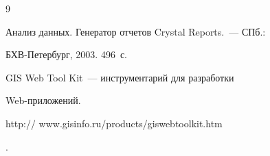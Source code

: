 {{\begin{thebibliography}{9}


      Анализ данных. Генератор отчетов Crystal Reports.~--- СПб.: 


      БХВ-Петербург, 2003.  496~с.


       


       \label{end\stat}


       




      GIS Web Tool Kit~--- инструментарий для разработки 


      Web-приложений. {\sf 


http:// www.gisinfo.ru/products/giswebtoolkit.htm}.


\end{thebibliography}


}


}    


